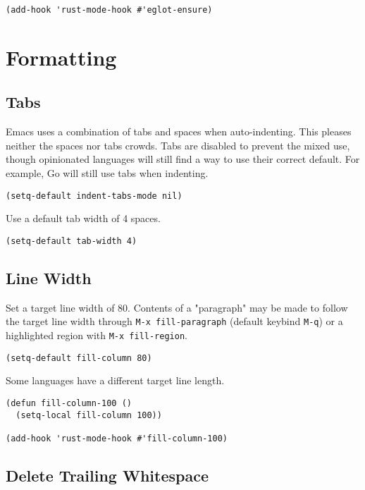 \documentclass[11pt]{article}
\begin{document}
\begin{verbatim}
(add-hook 'rust-mode-hook #'eglot-ensure)
\end{verbatim}
\section{Formatting}
\label{sec:org995248d}

\subsection{Tabs}
\label{sec:orgf4b43a2}

Emacs uses a combination of tabs and spaces when auto-indenting. This pleases
neither the spaces nor tabs crowds. Tabs are disabled to prevent the mixed use,
though opinionated languages will still find a way to use their correct
default. For example, Go will still use tabs when indenting.

\begin{verbatim}
(setq-default indent-tabs-mode nil)
\end{verbatim}

Use a default tab width of 4 spaces.

\begin{verbatim}
(setq-default tab-width 4)
\end{verbatim}
\subsection{Line Width}
\label{sec:orgf69f059}

Set a target line width of 80. Contents of a "paragraph" may be made to follow
the target line width through \texttt{M-x fill-paragraph} (default keybind \texttt{M-q}) or a
highlighted region with \texttt{M-x fill-region}.

\begin{verbatim}
(setq-default fill-column 80)
\end{verbatim}

Some languages have a different target line length.

\begin{verbatim}
(defun fill-column-100 ()
  (setq-local fill-column 100))

(add-hook 'rust-mode-hook #'fill-column-100)
\end{verbatim}
\subsection{Delete Trailing Whitespace}
\label{sec:org6b15ad7}
\end{document}
